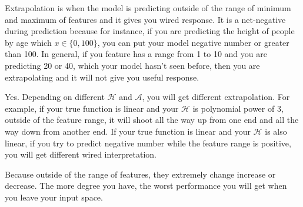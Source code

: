 \documentclass[12pt]{article}
\begin{document}
\begin{enumerate}


Extrapolation is when the model is predicting outside of the range of minimum and maximum of features and it gives you wired response. It is a net-negative during prediction because for instance, if you are predicting the height of people by age which $x \in \{0,100\}$, you can put your model negative number or greater than 100. In general, if you feature has a range from 1 to 10 and you are predicting 20 or 40, which your model hasn't seen before, then you are extrapolating and it will not give you useful response.


Yes. Depending on different $\mathcal{H}$ and $\mathcal{A}$, you will get different extrapolation. For example, if your true function is linear and your $\mathcal{H}$ is polynomial power of 3, outside of the feature range, it will shoot all the way up from one end and all the way down from another end. If your true function is linear and your $\mathcal{H}$ is also linear, if you try to predict negative number while the feature range is positive, you will get different wired interpretation.


Because outside of the range of features, they extremely change increase or decrease. The more degree you have, the worst performance you will get when you leave your input space.

\end{enumerate}
\end{document}
